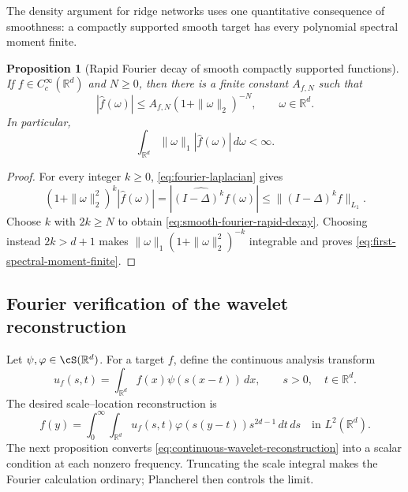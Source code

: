 \documentclass[11pt,twoside]{article}
\newcommand{\R}{\mathbb R}
\newtheorem{proposition}[theorem]{Proposition}
\theoremstyle{definition}
\theoremstyle{remark}
\begin{document}
The density argument for ridge networks uses one quantitative consequence of
smoothness: a compactly supported smooth target has every polynomial spectral
moment finite.

\begin{proposition}[Rapid Fourier decay of smooth compactly supported functions]
\label{prop:smooth-fourier-decay}
If $f\in C_c^\infty(\R^d)$ and $N\geq0$, then there is a finite constant
$A_{f,N}$ such that
\begin{equation}
 |\widehat f(\omega)|
 \leq A_{f,N}(1+\|\omega\|_2)^{-N},
 \qquad \omega\in\R^d.
 \label{eq:smooth-fourier-rapid-decay}
\end{equation}
In particular,
\begin{equation}
 \int_{\R^d}\|\omega\|_1|\widehat f(\omega)|\,d\omega<\infty.
 \label{eq:first-spectral-moment-finite}
\end{equation}
\end{proposition}

\begin{proof}
For every integer $k\geq0$, \cref{eq:fourier-laplacian} gives
\begin{equation}
 (1+\|\omega\|_2^2)^k|\widehat f(\omega)|
 =|\widehat{(I-\Delta)^kf}(\omega)|
 \leq\|(I-\Delta)^kf\|_{L_1}.
 \label{eq:rapid-decay-from-derivatives}
\end{equation}
Choose $k$ with $2k\geq N$ to obtain
\cref{eq:smooth-fourier-rapid-decay}. Choosing instead
$2k>d+1$ makes
$\|\omega\|_1(1+\|\omega\|_2^2)^{-k}$ integrable and proves
\cref{eq:first-spectral-moment-finite}.
\end{proof}

\subsection{Fourier verification of the wavelet reconstruction}

Let $\psi,\varphi\in\cS(\R^d)$. For a target $f$, define the continuous
analysis transform
\begin{equation}
 u_f(s,t)=\int_{\R^d}f(x)\psi(s(x-t))\,dx,
 \qquad s>0,\quad t\in\R^d.
 \label{eq:wavelet-analysis-transform}
\end{equation}
The desired scale--location reconstruction is
\begin{equation}
 f(y)=\int_0^\infty\int_{\R^d}
 u_f(s,t)\varphi(s(y-t))s^{2d-1}\,dt\,ds
 \quad\text{in $L^2(\R^d)$}.
 \label{eq:continuous-wavelet-reconstruction}
\end{equation}
The next proposition converts \cref{eq:continuous-wavelet-reconstruction}
into a scalar condition at each nonzero frequency. Truncating the scale
integral makes the Fourier calculation ordinary; Plancherel then controls the
limit.
\end{document}
